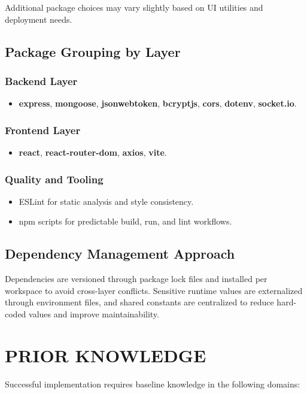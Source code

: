 \documentclass[12pt,a4paper]{report}
\begin{document}
Additional package choices may vary slightly based on UI utilities and deployment needs.

\section{Package Grouping by Layer}
\subsection{Backend Layer}
\begin{itemize}
    \item \textbf{express}, \textbf{mongoose}, \textbf{jsonwebtoken}, \textbf{bcryptjs}, \textbf{cors}, \textbf{dotenv}, \textbf{socket.io}.
\end{itemize}

\subsection{Frontend Layer}
\begin{itemize}
    \item \textbf{react}, \textbf{react-router-dom}, \textbf{axios}, \textbf{vite}.
\end{itemize}

\subsection{Quality and Tooling}
\begin{itemize}
    \item ESLint for static analysis and style consistency.
    \item npm scripts for predictable build, run, and lint workflows.
\end{itemize}

\section{Dependency Management Approach}
Dependencies are versioned through package lock files and installed per workspace to avoid cross-layer conflicts. Sensitive runtime values are externalized through environment files, and shared constants are centralized to reduce hard-coded values and improve maintainability.

\chapter{PRIOR KNOWLEDGE}
Successful implementation requires baseline knowledge in the following domains:
\end{document}
